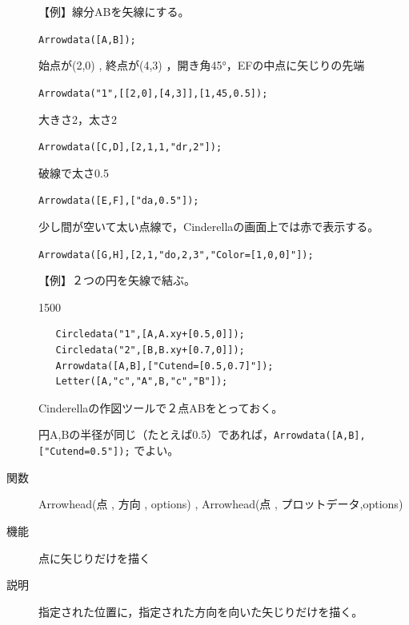 \documentclass[papersize,a4paper,12pt,uplatex]{jsarticle}
\begin{document}
\begin{description}
\vspace{\baselineskip}
【例】線分ABを矢線にする。
  
\hspace{10mm} \verb|Arrowdata([A,B]);|

始点が(2,0) , 終点が(4,3) ，開き角45°，EFの中点に矢じりの先端
      
\hspace{10mm}  \verb|Arrowdata("1",[[2,0],[4,3]],[1,45,0.5]);|
        
大きさ2，太さ2
      
\hspace{10mm} \verb|Arrowdata([C,D],[2,1,1,"dr,2"]);|
        
破線で太さ0.5
      
\hspace{10mm} \verb|Arrowdata([E,F],["da,0.5"]);|
        
 少し間が空いて太い点線で，Cinderellaの画面上では赤で表示する。
      
\hspace{10mm} \verb|Arrowdata([G,H],[2,1,"do,2,3","Color=[1,0,0]"]);| 

\hspace{20mm}  

【例】２つの円を矢線で結ぶ。
  
\begin{layer}{150}{0}
\end{layer}
\hspace{20mm}

\begin{verbatim}
   Circledata("1",[A,A.xy+[0.5,0]]);
   Circledata("2",[B,B.xy+[0.7,0]]);
   Arrowdata([A,B],["Cutend=[0.5,0.7]"]);
   Letter([A,"c","A",B,"c","B"]);
\end{verbatim}
  Cinderellaの作図ツールで２点ABをとっておく。

円A,Bの半径が同じ（たとえば0.5）であれば，\verb|Arrowdata([A,B],["Cutend=0.5"]);| でよい。

\vspace{\baselineskip}
\hypertarget{arrowhead}{}
\item[関数]  Arrowhead(点 , 方向 , options) , Arrowhead(点 , プロットデータ,options)
\item[機能]  点に矢じりだけを描く
\item[説明]  指定された位置に，指定された方向を向いた矢じりだけを描く。


\end{description}
\end{document}
